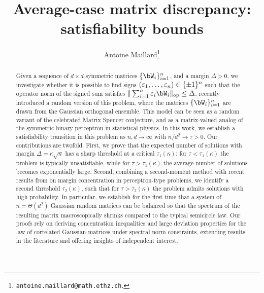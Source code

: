 \documentclass[a4paper,11pt]{article}
\begin{document}
\title{Average-case matrix discrepancy: satisfiability bounds}
\date{}

\author{Antoine Maillard\thanks{\texttt{antoine.maillard@math.ethz.ch}.}}
\maketitle

\begin{abstract}
    Given a sequence of $d \times d$ symmetric matrices $\{\bW_i\}_{i=1}^n$, and a margin $\Delta > 0$, we investigate whether it is possible to find signs $(\varepsilon_1, \dots, \varepsilon_n) \in \{\pm 1\}^n$ such that the operator norm of the signed sum satisfies $\|\sum_{i=1}^n \eps_i \bW_i\|_\op \leq \Delta$.
    \cite{kunisky2023online} recently introduced a random version of this problem, where the matrices $\{\bW_i\}_{i=1}^n$ are drawn from the Gaussian orthogonal ensemble. 
    This model can be seen as a random variant of the celebrated Matrix Spencer conjecture, and as a matrix-valued analog of the symmetric binary perceptron in statistical physics.
%
    In this work, we establish a satisfiability transition in this problem as $n, d \to \infty$ with $n / d^2 \to \tau > 0$.
    Our contributions are twofold. 
    First, we prove that the expected number of solutions with margin $\Delta = \kappa \sqrt{n}$ has a sharp threshold at a critical $\tau_1(\kappa)$: 
    for $\tau < \tau_1(\kappa)$ the problem is typically unsatisfiable, while for $\tau > \tau_1(\kappa)$ the average number of solutions becomes exponentially large.
    Second, combining a second-moment method with recent results from \cite{altschuler2023zero} on margin concentration in perceptron-type problems, we identify a second threshold $\tau_2(\kappa)$, 
    such that for $\tau > \tau_2(\kappa)$ the problem admits solutions with high probability.
%
    In particular, we establish for the first time that a system of $n = \Theta(d^2)$ Gaussian random matrices can be balanced so that the spectrum of the resulting matrix macroscopically shrinks compared to the typical semicircle law.
    Our proofs rely on deriving concentration inequalities and large deviation properties for the law of correlated Gaussian matrices under spectral norm constraints, extending results in the literature and offering insights of independent interest.
\end{abstract}

\setcounter{tocdepth}{2}
\tableofcontents
\end{document}
